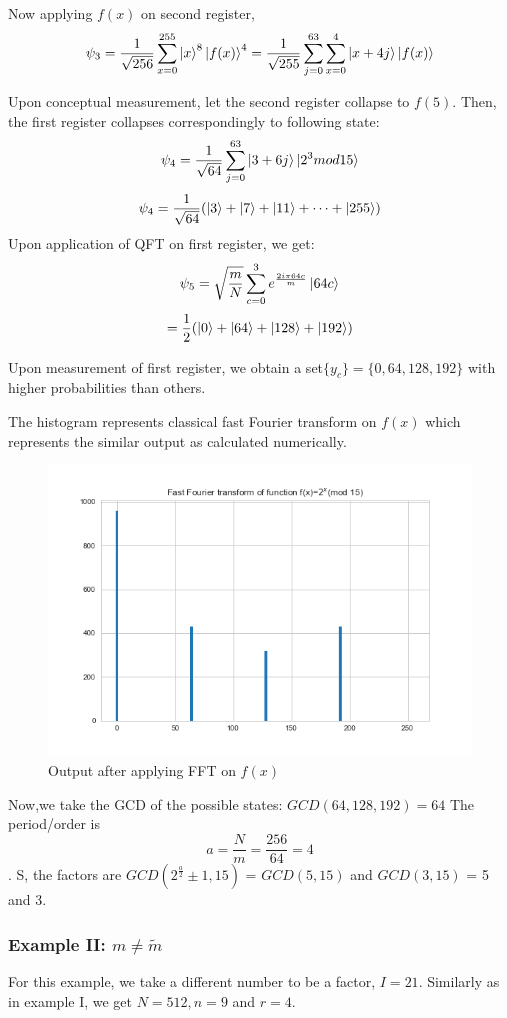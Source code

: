 Now applying $f(x)$ on second register,
 $$\psi_3 = \frac{1}{\sqrt{256}} \sum_{x=0}^{255} \ket{x}^8\ket{f(x)}^4 =  \frac{1}{\sqrt{255}}  \sum_{j=0}^{63} \sum_{x=0}^{4} \ket{x +4j} \ket{f(x)}$$
 
Upon conceptual measurement, let the second register collapse to $f(5)$. Then, the first register collapses correspondingly to following state:
$$\psi_4 = \frac{1}{\sqrt{64}} \sum_{j=0}^{63} \ket{3+6j} \ket{2^3 mod 15} $$
$$\psi_4 = \frac{1}{\sqrt{64}} ( \ket{3} + \ket{7} +\ket{11}+ \dots + \ket{255} )$$
Upon application of QFT on first register, we get:
$$\psi_5 = \sqrt{\frac{m}{N}} \sum_{c=0}^{3} e^{\frac{2i\pi  64c}{m}} \ket{64c} $$
$$= \frac{1}{2} (\ket{0} + \ket{64} + \ket{128} + \ket{192} )$$

Upon measurement of first register, we obtain a set$\{y_c\} = \{0,64,128,192\}$ with higher probabilities than others.

The histogram represents classical fast Fourier transform on $f(x)$ which represents the similar output as calculated numerically.
\begin{figure}[H]
    \centering
    \includegraphics[scale=0.45]{figures/fft_on_2^xmod15.png} 
    \caption{Output after applying \acrshort{FFT} on $f(x)$}
    \label{fig: fft_on_2^xmod15_2}
\end{figure}

Now,we take the GCD of the possible states: $GCD(64, 128, 192) = 64$
The period/order is $$a=\frac{N}{m}= \frac{256}{64}= 4$$.
S, the factors are $GCD(2^{\frac{a}{2}} \pm 1, 15)$ = $GCD(5,15)$ and $GCD(3,15)$ = 5 and 3.

\subsubsection{Example II: $m\neq \tilde{m}$}
For this example, we take a different number to be a factor, $I=21$. Similarly as in example I, we get $N=512, n=9$ and $r=4$.

